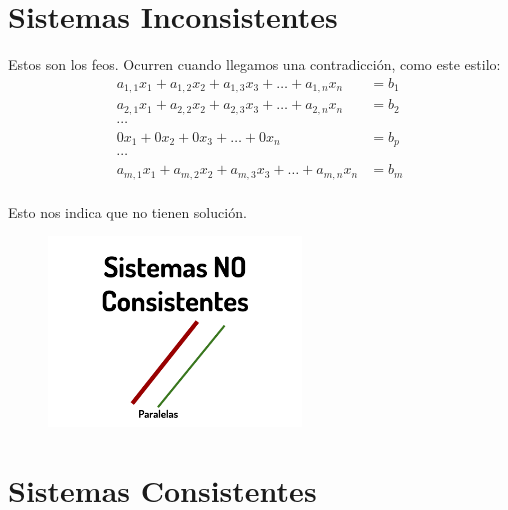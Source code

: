 \documentclass[12pt, fleqn]{report}                             %
\theoremstyle{break}                                            %
\begin{document}
        \section{Sistemas Inconsistentes}

            Estos son los feos.
            Ocurren cuando llegamos una contradicción, como este estilo:
            \begin{align*}
                a_{1,1}x_1 + a_{1,2}x_2 + a_{1,3}x_3 + \dots + a_{1,n}x_n &= b_1 \\
                a_{2,1}x_1 + a_{2,2}x_2 + a_{2,3}x_3 + \dots + a_{2,n}x_n &= b_2 \\
               \cdots                                                            \\
                0x_1       + 0x_2       + 0x_3       + \dots + 0x_n       &= b_p \\
               \cdots                                                            \\
                a_{m,1}x_1 + a_{m,2}x_2 + a_{m,3}x_3 + \dots + a_{m,n}x_n &= b_m \\
            \end{align*}

            Esto nos indica que no tienen solución.

            \begin{figure}[h]
                \centering
                \includegraphics[width=0.60\textwidth]{SistemasNoConsistentes}
            \end{figure}


        \clearpage
        \section{Sistemas Consistentes}
\end{document}
